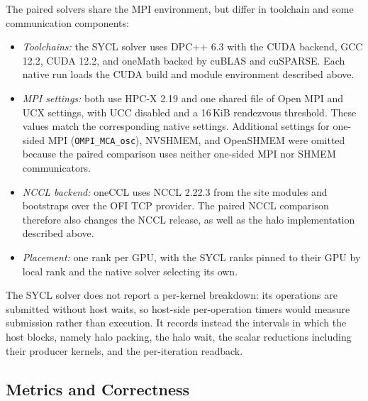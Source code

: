 The paired solvers share the MPI environment, but differ in toolchain and some communication components:
\begin{itemize}
    \item \emph{Toolchains:} the SYCL solver uses DPC++ 6.3 with the CUDA backend, GCC 12.2, CUDA 12.2, and oneMath backed by cuBLAS and cuSPARSE. Each native run loads the CUDA build and module environment described above.
    \item \emph{MPI settings:} both use HPC-X 2.19 and one shared file of Open MPI and UCX settings, with UCC disabled and a 16\,KiB rendezvous threshold. These values match the corresponding native settings. Additional settings for one-sided MPI (\texttt{OMPI\_MCA\_osc}), NVSHMEM, and OpenSHMEM were omitted because the paired comparison uses neither one-sided MPI nor SHMEM communicators.
    \item \emph{NCCL backend:} oneCCL uses NCCL 2.22.3 from the site modules and bootstraps over the \ac{OFI} TCP provider. The paired NCCL comparison therefore also changes the NCCL release, as well as the halo implementation described above.
    \item \emph{Placement:} one rank per GPU, with the SYCL ranks pinned to their GPU by local rank and the native solver selecting its own.
\end{itemize}
The SYCL solver does not report a per-kernel breakdown: its operations are submitted without host waits, so host-side per-operation timers would measure submission rather than execution. It records instead the intervals in which the host blocks, namely halo packing, the halo wait, the scalar reductions including their producer kernels, and the per-iteration readback.

\subsection{Metrics and Correctness}

